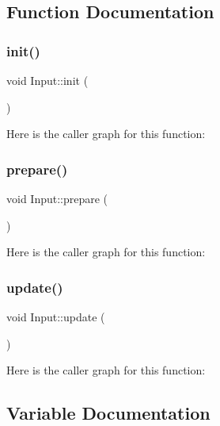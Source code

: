 \subsection{Function Documentation}
\mbox{\label{namespace_input_a4c2078b689fc3b5cfa1887bfb3aa02a6}} 
\subsubsection{\texorpdfstring{init()}{init()}}
{\footnotesize\ttfamily void Input\+::init (\begin{DoxyParamCaption}{ }\end{DoxyParamCaption})}

Here is the caller graph for this function\+:
\mbox{\label{namespace_input_a54c493c965c2acd755b8469156f086fb}} 
\subsubsection{\texorpdfstring{prepare()}{prepare()}}
{\footnotesize\ttfamily void Input\+::prepare (\begin{DoxyParamCaption}{ }\end{DoxyParamCaption})}

Here is the caller graph for this function\+:
\mbox{\label{namespace_input_aa7fe26710dd863d11737bf2f6de4ad05}} 
\subsubsection{\texorpdfstring{update()}{update()}}
{\footnotesize\ttfamily void Input\+::update (\begin{DoxyParamCaption}{ }\end{DoxyParamCaption})}

Here is the caller graph for this function\+:


\subsection{Variable Documentation}
\mbox{\label{namespace_input_a97726c05e4bc2d633c725272ac33828e}} 
